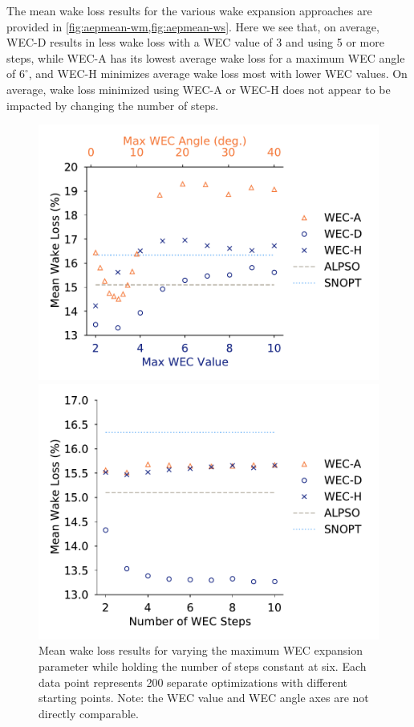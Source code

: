 \documentclass{jpconf}
\begin{document}
The mean wake loss results for the various wake expansion approaches are provided in \cref{fig:aepmean-wm,fig:aepmean-ws}. Here we see that, on average, WEC-D results in less wake loss with a WEC value of 3 and using 5 or more steps, while WEC-A has its lowest average wake loss for a maximum WEC angle of $6^\circ$, and WEC-H minimizes average wake loss most with lower WEC values. On average, wake loss minimized using WEC-A or WEC-H does not appear to be impacted by changing the number of steps.
%
\begin{figure}[ht]
	\centering
	\begin{minipage}[t]{0.47\textwidth}
		\centering
		\includegraphics[width=\textwidth, trim={0cm 0cm 0cm 0cm}, clip]{tests/maxwec_const_nsteps6_mean}
		\caption{Mean wake loss results for varying the maximum WEC expansion parameter while holding the number of steps constant at six. Each data point represents 200 separate optimizations with different starting points. Note: the WEC value and WEC angle axes are not directly comparable.}
		\label{fig:aepmean-wm}
	\end{minipage}\hspace{1pc}
	\begin{minipage}[t]{0.47\textwidth}
		\centering
		\includegraphics[width=\textwidth]{tests/nsteps_const_maxwec_mean}

\end{minipage}
\end{figure}
\end{document}
